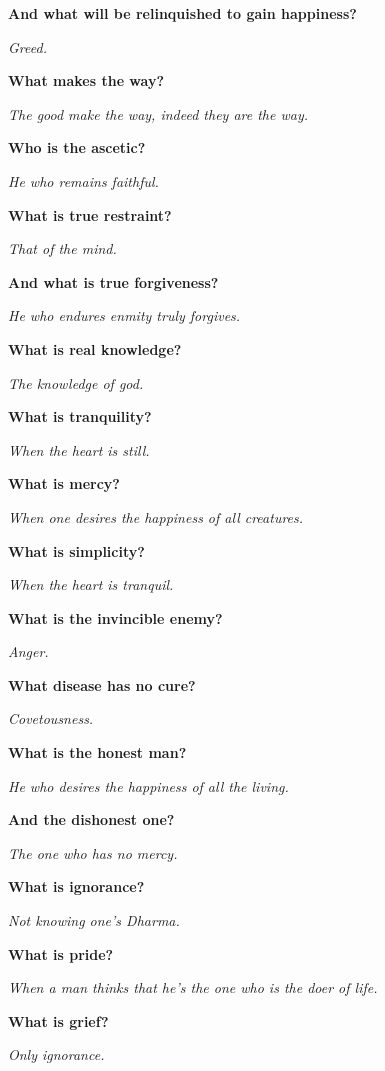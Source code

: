 \textbf{And what will be relinquished to gain happiness?} 

\textit{Greed.}\medskip 

\textbf{What makes the way?} 

\textit{The good make the way, indeed they are the way.}\medskip 

\textbf{Who is the ascetic?} 

\textit{He who remains faithful.}\medskip 

\textbf{What is true restraint?} 

\textit{That of the mind.}\medskip 

\textbf{And what is true forgiveness?} 

\textit{He who endures enmity truly forgives.}\medskip 

\textbf{What is real knowledge?} 

\textit{The knowledge of god.}\medskip 

\textbf{What is tranquility?} 

\textit{When the heart is still.}\medskip 

\textbf{What is mercy?} 

\textit{When one desires the happiness of all creatures.}\medskip 

\textbf{What is simplicity?} 

\textit{When the heart is tranquil.}\medskip 

\textbf{What is the invincible enemy?} 

\textit{Anger.}\medskip 

\textbf{What disease has no cure?} 

\textit{Covetousness.}\medskip 

\textbf{What is the honest man?} 

\textit{He who desires the happiness of all the living.}\medskip\vfill\pagebreak\vspace*{1.2cm} 

\textbf{And the dishonest one?} 

\textit{The one who has no mercy.}\medskip 

\textbf{What is ignorance?} 

\textit{Not knowing one's Dharma.}\medskip 

\textbf{What is pride?} 

\textit{When a man thinks that he's the one who is the doer of life.}\medskip 

\textbf{What is grief?} 

\textit{Only ignorance.}\medskip 

